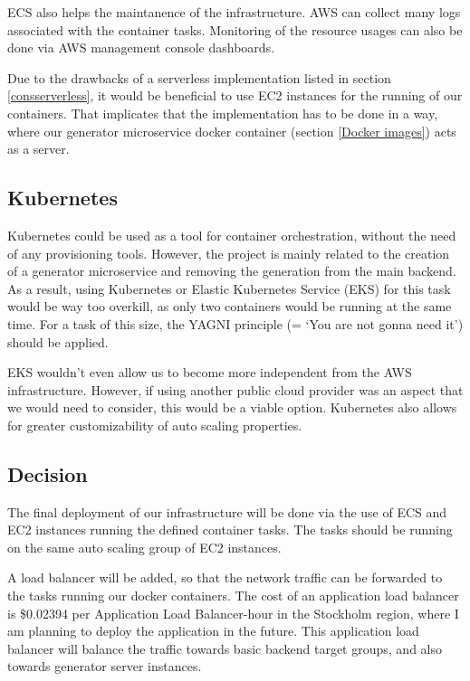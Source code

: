 		ECS also helps the maintanence of the infrastructure. AWS can collect many logs associated with 
		the container tasks. Monitoring of the resource usages can also be done via AWS management console dashboards.

		Due to the drawbacks of a serverless implementation listed in section \ref{consserverless}, it would be beneficial to use EC2 instances
		for the running of our containers. That implicates that the implementation has to be done in a way, where our generator
		microservice docker container (section \ref{Docker images}) acts as a server.

	\subsection{Kubernetes}
		Kubernetes could be used as a tool for container orchestration, without the need of any provisioning tools. 
		However, the project is mainly related to the creation of a generator
		microservice and removing the generation from the main backend. As a result, using 
		Kubernetes or Elastic Kubernetes Service (EKS) for this task
		would be way too overkill, as only two containers would be running at the same time. 
		For a task of this size, the YAGNI principle (= `You are not gonna need it') should be applied.
		
		EKS wouldn't even allow us to become more independent
		from the AWS infrastructure. However, if using another 
		public cloud provider was an aspect that we would need to consider, this would be a viable option. Kubernetes also allows for 
		greater customizability of auto scaling properties.

	\subsection{Decision} \label{awsdecision}
		The final deployment of our infrastructure will be done via the use of ECS and EC2 instances running the defined container tasks.
		The tasks should be running on the same auto scaling group of EC2 instances. 
		
		A load balancer will be added, so that the 
		network traffic can be forwarded to the tasks running our docker containers. The cost of an application load balancer is \$0.02394 per Application 
		Load Balancer-hour in the Stockholm region, where I am planning to deploy the application in the future. This application load balancer
		will balance the traffic towards basic backend target groups, and also towards generator server instances.

